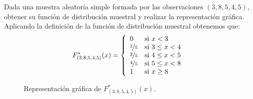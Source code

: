 \begin{ejercicio}
    Dada una muestra aleatoria simple formada por las observaciones $(3, 8, 5, 4, 5)$, obtener su función de distribución muestral y realizar la representación gráfica.\\

    \noindent
    Aplicando la definición de la función de distribución muestral obtenemos que:
    \begin{equation*}
        F_{(3, 8, 5, 4, 5)}^\ast(x) = \left\{\begin{array}{ll}
                0 & \text{si\ } x < 3 \\
                \nicefrac{1}{5} & \text{si\ } 3 \leq x < 4 \\
                \nicefrac{2}{5} & \text{si\ } 4 \leq x < 5 \\
                \nicefrac{4}{5} & \text{si\ } 5 \leq x < 8 \\
                1 & \text{si\ } x \geq 8 
        \end{array}\right.
    \end{equation*}

    \begin{figure}[H]
        \centering
        \caption{Representación gráfica de $F_{(3,8,5,4,5)}^\ast (x)$.}
    \end{figure}
\end{ejercicio}

